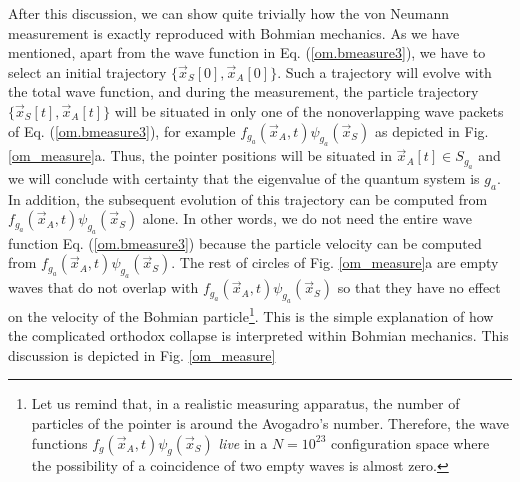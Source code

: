 \documentclass[nofootinbib, secnumarabic, amsmath, nobibnotes,11pt,aps,pra, floatfix]{revtex4-1}
\newcommand{\fref}[1]{Fig. \ref{#1}}
\newcommand{\eref}[1]{Eq. (\ref{#1})}
\begin{document}
After this discussion, we can show quite trivially how the von
Neumann measurement is exactly reproduced with Bohmian mechanics. As
we have mentioned, apart from the wave function in \eref{om.bmeasure3}, we
have to select an initial trajectory $\{\vec x_S[0],\vec x_A[0]\}$.
Such a trajectory will evolve with the total wave function, and
during the measurement, the particle trajectory $\{\vec x_S[t],\vec
x_A[t]\}$ will be situated in only one of the nonoverlapping wave
packets of \eref{om.bmeasure3}, for example $f_{g_a}(\vec x_A,t)
\psi_{g_a}(\vec x_S)$ as depicted in \fref{om_measure}a. Thus, the
pointer positions will be situated in $\vec x_A[t]\in S_{g_a}$ and
we will conclude with certainty that the eigenvalue of the quantum
system is $g_a$. In addition, the subsequent evolution of this
trajectory can be computed from $f_{g_a}(\vec x_A,t) \psi_{g_a}(\vec
x_S)$ alone. In other words, we do not need the entire wave function
\eref{om.bmeasure3} because the particle velocity can be computed
from $f_{g_a}(\vec x_A,t) \psi_{g_a}(\vec x_S)$. The rest of circles
of \fref{om_measure}a are empty waves that do not overlap with
$f_{g_a}(\vec x_A,t) \psi_{g_a}(\vec x_S)$ so that they have no
effect on the velocity of the Bohmian particle\footnote{Let us remind that, in a realistic measuring apparatus, the number of particles of the pointer is around the Avogadro's number. Therefore, the wave functions $f_{g}(\vec x_A,t) \psi_{g}(\vec x_S)$ \emph{live} in a $N=10^{23}$ configuration space where the possibility of a coincidence of two empty waves is almost zero.}. This is the simple
explanation of how the complicated orthodox collapse is interpreted
within Bohmian mechanics. This discussion is depicted in
\fref{om_measure}
\end{document}
